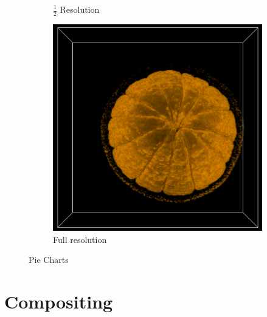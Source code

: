 \documentclass[a4paper,twoside,11pt]{article}
\begin{document}
\begin{figure}[h]
\begin{center}
\begin{subfigure}[b]{0.23\textwidth}
                \caption{$\frac{1}{2}$ Resolution}
                \label{fig:res2}
        \end{subfigure}
        \begin{subfigure}[b]{0.23\textwidth}
                \includegraphics[width=\textwidth]{Images/res1.png}
                \caption{Full resolution}
                \label{fig:res1}
        \end{subfigure}
        \caption{Pie Charts}\label{fig:Resolutions}
\end{center}
\end{figure}


\section{Compositing}
\newpage
\end{document}

